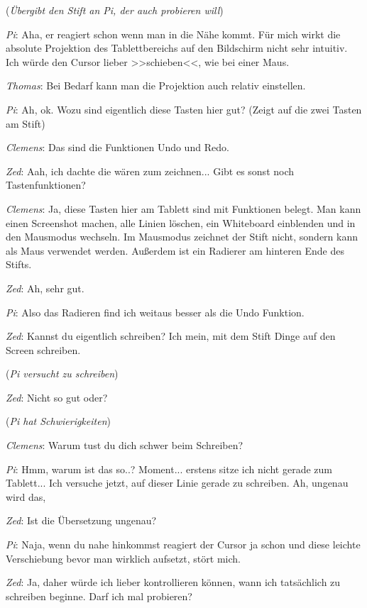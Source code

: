 \medskip (\emph{Übergibt den Stift an Pi, der auch probieren will})

\medskip \emph{Pi}: Aha, er reagiert schon wenn man in die Nähe kommt. Für mich wirkt die absolute Projektion des Tablettbereichs auf den Bildschirm nicht sehr intuitiv. Ich würde den Cursor lieber >>schieben<<, wie bei einer Maus.

\medskip \emph{Thomas}: Bei Bedarf kann man die Projektion auch relativ einstellen.

\medskip \emph{Pi}: Ah, ok. Wozu sind eigentlich diese Tasten hier gut? (Zeigt auf die zwei Tasten am Stift) 

\medskip \emph{Clemens}: Das sind die Funktionen Undo und Redo.

\medskip \emph{Zed}: Aah, ich dachte die wären zum zeichnen... Gibt es sonst noch Tastenfunktionen?

\medskip \emph{Clemens}: Ja, diese Tasten hier am Tablett sind mit Funktionen belegt. Man kann einen Screenshot machen, alle Linien löschen, ein Whiteboard einblenden und in den Mausmodus wechseln. Im Mausmodus zeichnet der Stift nicht, sondern kann als Maus verwendet werden. Außerdem ist ein Radierer am hinteren Ende des Stifts.

\medskip \emph{Zed}: Ah, sehr gut.

\medskip \emph{Pi}: Also das Radieren find ich weitaus besser als die Undo Funktion.

\medskip \emph{Zed}: Kannst du eigentlich schreiben? Ich mein, mit dem Stift Dinge auf den Screen schreiben. 

\medskip (\emph{Pi versucht zu schreiben})

\medskip \emph{Zed}: Nicht so gut oder?

\medskip (\emph{Pi hat Schwierigkeiten})

\medskip \emph{Clemens}: Warum tust du dich schwer beim Schreiben?

\medskip \emph{Pi}: Hmm, warum ist das so..? Moment... erstens sitze ich nicht gerade zum Tablett... Ich versuche jetzt, auf dieser Linie gerade zu schreiben. Ah, ungenau wird das,

\medskip \emph{Zed}: Ist die Übersetzung ungenau?

\medskip \emph{Pi}: Naja, wenn du nahe hinkommst reagiert der Cursor ja schon und diese leichte Verschiebung bevor man wirklich aufsetzt, stört mich. 

\medskip \emph{Zed}: Ja, daher würde ich lieber kontrollieren können, wann ich tatsächlich zu schreiben beginne. Darf ich mal probieren?

